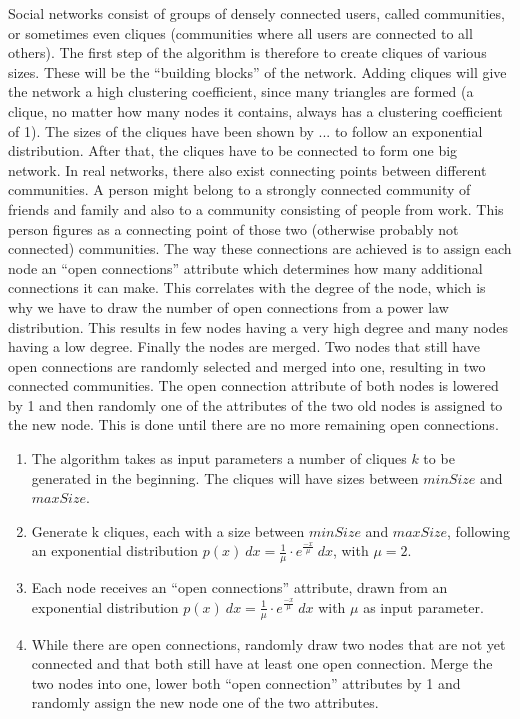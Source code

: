 Social networks consist of groups of densely connected users, called communities, or sometimes even cliques (communities where all users are connected to all others). The first step of the algorithm is therefore to create cliques of various sizes. These will be the ``building blocks'' of the network. Adding cliques will give the network a high clustering coefficient, since many triangles are formed (a clique, no matter how many nodes it contains, always has a clustering coefficient of 1). The sizes of the cliques have been shown by ... to follow an exponential distribution. After that, the cliques have to be connected to form one big network. In real networks, there also exist connecting points between different communities. A person might belong to a strongly connected community of friends and family and also to a community consisting of people from work. This person figures as a connecting point of those two (otherwise probably not connected) communities. The way these connections are achieved is to assign each node an ``open connections'' attribute which determines how many additional connections it can make. This correlates with the degree of the node, which is why we have to draw the number of open connections from a power law distribution. This results in few nodes having a very high degree and many nodes having a low degree. Finally the nodes are merged. Two nodes that still have open connections are randomly selected and merged into one, resulting in two connected communities. The open connection attribute of both nodes is lowered by 1 and then randomly one of the attributes of the two old nodes is assigned to the new node. This is done until there are no more remaining open connections.

\begin{enumerate}
\item The algorithm takes as input parameters a number of cliques $k$ to be generated in the beginning. The cliques will have sizes between $minSize$ and $maxSize$.
\item Generate k cliques, each with a size between $minSize$ and $maxSize$, following an exponential distribution $p(x)\:dx = \frac{1}{\mu} \cdot e^{\frac{-x}{\mu}}\:dx$, with $\mu = 2$.
\item Each node receives an ``open connections'' attribute, drawn from an exponential distribution $p(x)\:dx = \frac{1}{\mu} \cdot e^{\frac{-x}{\mu}}\:dx$ with $\mu$ as input parameter.
\item While there are open connections, randomly draw two nodes that are not yet connected and that both still have at least one open connection. Merge the two nodes into one, lower both ``open connection'' attributes by 1 and randomly assign the new node one of the two attributes.
\end{enumerate}

